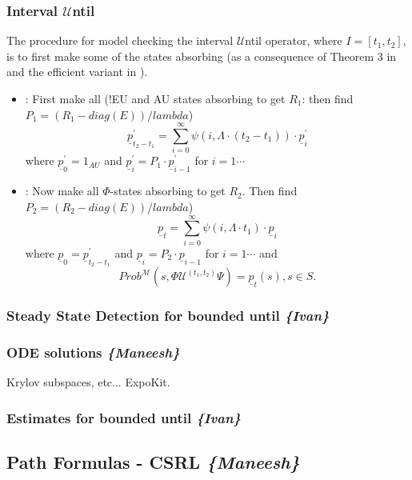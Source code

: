 \documentclass[a4paper,10pt]{article}
\begin{document}
	\subsubsection{Interval $\mathcal{U}$ntil}
	The procedure for model checking the interval $\mathcal{U}$ntil operator, where $I=[t_1,t_2]$, is to first make some of the states absorbing (as a consequence of Theorem 3 in \cite{baier1} and the efficient variant in \cite{katoen1}).
	\begin{itemize}
		\item:  First make all (!EU and AU states absorbing to get $R_1$: then find $P_1 = (R_1-diag(E))/lambda$)
	\begin{equation*}	
	\underline{p}_{t_2-t_1}^{\prime}=\sum\limits_{i=0}^{\infty }\psi(i, \Lambda\cdot (t_2-t_1))\cdot \underline{p}_{i}^{\prime}
	\end{equation*}
	where $\underline{p}_{0}^{\prime} = 1_{AU}$ and $\underline{p}_{i}^{\prime}=P_1\cdot\underline{p}_{i-1}^{\prime}$ for $i=1\cdots$
		\item: Now make all $\Phi$-states absorbing to get $R_2$. Then find $P_2 = (R_2-diag(E))/lambda$)
	\begin{equation*}	
	\underline{p}_{t}=\sum\limits_{i=0}^{\infty }\psi(i, \Lambda\cdot t_1)\cdot \underline{p}_{i}
	\end{equation*}
	where $\underline{p}_{0} = \underline{p}_{t_2-t_1}^{\prime}$ and $\underline{p}_{i}=P_2\cdot\underline{p}_{i-1}$ for $i=1\cdots$ and
	\begin{equation*}
	Prob^{\mathcal{M}}(s,\Phi\mathcal{U}^{(t_1,t_2)}\Psi)= \underline{p}_{t}(s), s\in S.
	\end{equation*}
	\end{itemize}
\subsubsection{Steady State Detection for bounded until \textit{\{Ivan\}}}
\subsubsection{ODE solutions \textit{\{Maneesh\}}}
	Krylov subspaces, etc... ExpoKit.
\subsubsection{Estimates for bounded until \textit{\{Ivan\}}}
	
\subsection{Path Formulas - CSRL \textit{\{Maneesh\}}}
\end{document}
